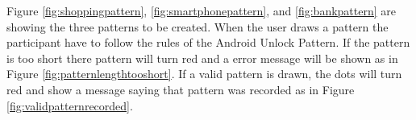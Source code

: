     Figure \ref{fig:shoppingpattern}, \ref{fig:smartphonepattern}, and \ref{fig:bankpattern} are showing the three patterns to be created. When the user draws a pattern the participant have to follow the rules of the Android Unlock Pattern. If the pattern is too short there pattern will turn red and a error message will be shown as in Figure \ref{fig:patternlengthtooshort}. If a valid pattern is drawn, the dots will turn red and show a message saying that pattern was recorded as in Figure \ref{fig:validpatternrecorded}.

    

    \begin{figure}[H]
      \centering
\end{figure}
